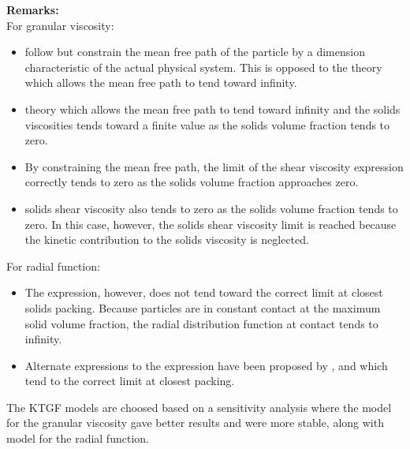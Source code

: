 \documentclass[11pt]{report}
\begin{document}
\textbf{Remarks:}\\
%
For granular viscosity: 
%
\begin{itemize}
%
\item \citet{henrya}  follow \citet{Lun_1984}  but constrain the mean free path of the particle by a dimension characteristic of the actual physical system. 
%
This is opposed to the \citet{Lun_1984}  theory which allows the mean free path to tend toward infinity.
%
\item \citet{Lun_1984}  theory which allows the mean free path to tend toward infinity and the solids viscosities tends toward a finite value as the solids volume fraction tends to zero.
%
\item By constraining the mean free path, the limit of the \citet{henrya}  shear viscosity expression correctly tends to zero as the solids volume fraction approaches zero.
%
\item \citet{symlal1993} solids shear viscosity also tends to zero as the solids volume fraction tends to zero. 
%
In this case, however, the solids shear viscosity limit is reached because the kinetic contribution to the solids viscosity is neglected.
%
\end{itemize}%
%
For radial function:
%
\begin{itemize}
%
\item  The \citet{Carnahan-1969} expression, however, does not tend toward the correct limit at closest solids packing. 
%
Because particles are in constant contact at the maximum solid volume fraction, the radial distribution function at contact tends to infinity.
% 
\item Alternate expressions to the \citet{Carnahan-1969} expression have been proposed by \citet{GID-1994}, \citet{lun1986} and \citet{sinclair-1989} which tend to the correct limit at closest packing.
%
\end{itemize}
%
The KTGF models are choosed based on a sensitivity analysis where the \citet{symlal1993} model for the granular viscosity gave better results and were more stable, along with \citet{sinclair-1989} model for the radial function.
%
\end{document}
